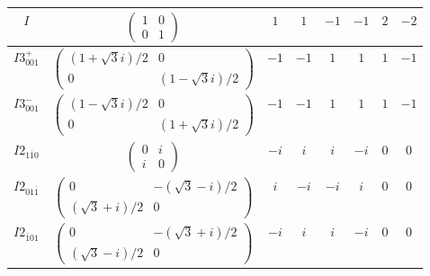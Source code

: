 \documentclass[3p,preprint]{elsarticle}
\begin{document}
\begin{table}[H]
\begin{tabular}{|c|c||c|c|c|c|c|c|}
		$I$ & 					$\left(\begin{array}{cc} 1&0 \\ 0&1 \end{array}\right)$ & $1$ & $1$ & $-1$ & $-1$ & $2$ & $-2$ \\ \hline
		$I3^{+}_{001}$ &		$\left(\begin{array}{cc} (1+\sqrt{3}i)/2&0 \\ 0&(1-\sqrt{3}i)/2 \end{array}\right)$ &$-1$ & $-1$ & $1$ & $1$ & $1$ & $-1$ \\ \hline
		$I3^{-}_{001}$ &		$\left(\begin{array}{cc} (1-\sqrt{3}i)/2&0 \\ 0&(1+\sqrt{3}i)/2 \end{array}\right)$ &$-1$ & $-1$ & $1$ & $1$ & $1$ & $-1$ \\ \hline
		$I2_{1\bar{1}0}$ &					$\left(\begin{array}{cc} 0&i \\ i&0 \end{array}\right)$ &$-i$ & $i$ & $i$ & $-i$ & $0$ & $0$ \\ \hline
		$I2_{01\bar{1}}$ &				$\left(\begin{array}{cc} 0&-(\sqrt{3}-i)/2 \\ (\sqrt{3}+i)/2&0 \end{array}\right)$ &$i$ & $-i$ & $-i$ & $i$ & $0$ & $0$ \\ \hline
		$I2_{\bar{1}01}$ &		$\left(\begin{array}{cc} 0&-(\sqrt{3}+i)/2 \\ (\sqrt{3}-i)/2&0 \end{array}\right)$ &$-i$ & $i$ & $i$ & $-i$ & $0$ & $0$ \\ \hline
	\end{tabular}
\end{table}
\end{document}
